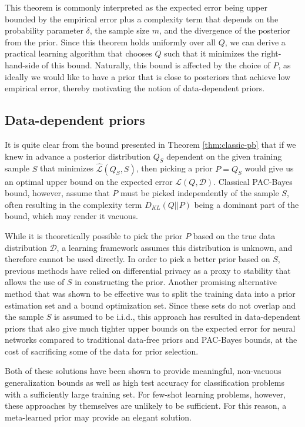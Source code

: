\documentclass{article}
\theoremstyle{definition}
\begin{document}
This theorem is commonly interpreted as the expected error being upper bounded by the empirical error plus a complexity term that depends on the probability parameter $\delta$, the sample size $m$, and the divergence of the posterior from the prior. Since this theorem holds uniformly over all $Q$, we can derive a practical learning algorithm that chooses $Q$ such that it minimizes the right-hand-side of this bound. Naturally, this bound is affected by the choice of $P$, as ideally we would like to have a prior that is close to posteriors that achieve low empirical error, thereby motivating the notion of data-dependent priors.

\subsection{Data-dependent priors}

It is quite clear from the bound presented in Theorem \ref{thm:classic-pb} that if we knew in advance a posterior distribution $Q_S$ dependent on the given training sample $S$ that minimizes $\hat{\mathcal{L}}(Q_S, S)$, then picking a prior $P=Q_S$ would give us an optimal upper bound on the expected error $\mathcal{L}(Q,\mathcal{D})$.
Classical PAC-Bayes bound, however, assume that $P$ must be picked independently of the sample $S$, often resulting in the complexity term $D_{KL}(Q||P)$ being a dominant part of the bound, which may render it vacuous. 

While it is theoretically possible to pick the prior $P$ based on the true data distribution $\mathcal{D}$, a learning framework assumes this distribution is unknown, and therefore  cannot be used directly. In order to pick a better prior based on $S$, previous methods have relied on differential privacy \citep{Dziugaite2018} as a proxy to stability that allows the use of $S$ in constructing the prior. Another promising alternative method that was shown to be effective \citep{Dziugaite2017, Perez-Ortiz2021} was to split the training data into a prior estimation set and a bound optimization set. Since these sets do not overlap and the sample $S$ is assumed to be i.i.d., this approach has resulted in data-dependent priors that also give much tighter upper bounds on the expected error for neural networks compared to traditional data-free priors and PAC-Bayes bounds, at the cost of sacrificing some of the data for prior selection.

Both of these solutions have been shown to provide meaningful, non-vacuous generalization bounds as well as high test accuracy for classification problems with a sufficiently large training set. For few-shot learning problems, however, these approaches by themselves are unlikely to be sufficient. For this reason, a meta-learned prior may provide an elegant solution.
\end{document}
